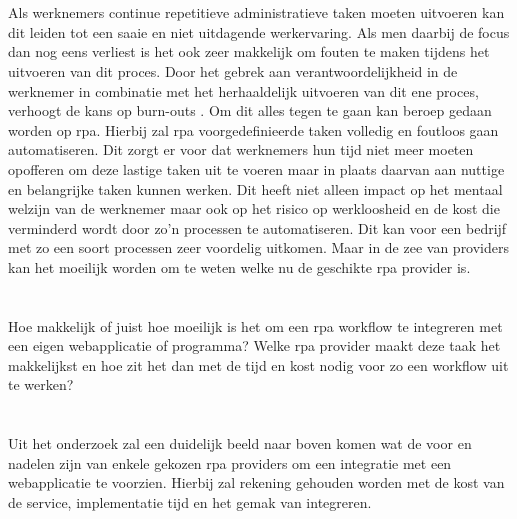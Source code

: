 \section{}
\label{sec:probleemstelling}
Als werknemers continue repetitieve administratieve taken moeten uitvoeren kan dit leiden tot een saaie en niet uitdagende werkervaring. Als men daarbij de focus dan nog eens verliest is het ook zeer makkelijk om fouten te maken tijdens het uitvoeren van dit proces. Door het gebrek aan verantwoordelijkheid in de werknemer in combinatie met het herhaaldelijk uitvoeren van dit ene proces, verhoogt de kans op burn-outs \autocite{burnout}. Om dit alles tegen te gaan kan beroep gedaan worden op \acrlong{rpa}. Hierbij zal \acrshort{rpa} voorgedefinieerde taken volledig en foutloos gaan automatiseren. Dit zorgt er voor dat werknemers hun tijd niet meer moeten opofferen om deze lastige taken uit te voeren maar in plaats daarvan aan nuttige en belangrijke taken kunnen werken. Dit heeft niet alleen impact op het mentaal welzijn van de werknemer maar ook op het risico op werkloosheid en de kost die verminderd wordt door zo'n processen te automatiseren. Dit kan voor een bedrijf met zo een soort processen zeer voordelig uitkomen. Maar in de zee van providers kan het moeilijk worden om te weten welke nu de geschikte \acrshort{rpa} provider is.

\section{}
\label{sec:onderzoeksvraag}
Hoe makkelijk of juist hoe moeilijk is het om een \acrshort{rpa} \gls{workflow} te integreren met een eigen webapplicatie of programma? Welke \acrshort{rpa} provider maakt deze taak het makkelijkst en hoe zit het dan met de tijd en kost nodig voor zo een \gls{workflow} uit te werken?


\section{}
\label{sec:onderzoeksdoelstelling}
Uit het onderzoek zal een duidelijk beeld naar boven komen wat de voor en nadelen zijn van enkele gekozen \acrshort{rpa} providers om een integratie met een webapplicatie te voorzien. Hierbij zal rekening gehouden worden met de kost van de service, implementatie tijd en het gemak van integreren.

